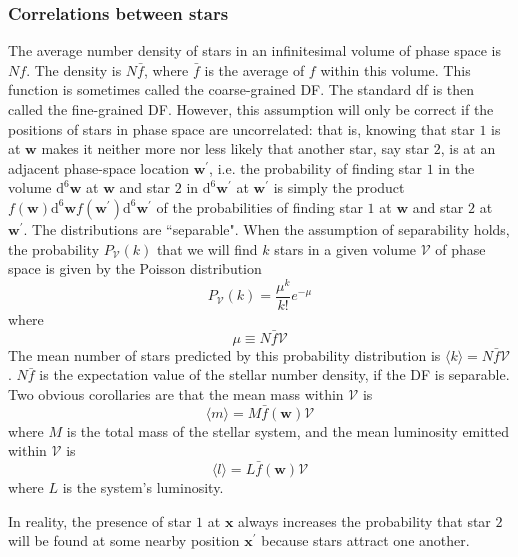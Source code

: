 \documentclass[12pt,a4paper]{article}
\renewcommand{\vec}[1]{\boldsymbol{#1}}
\newcommand{\dif}{\mathrm{d}}
\begin{document}
\subsubsection{Correlations between stars}
The average number density of stars in an infinitesimal volume of phase space is $Nf$. The density is $N \bar{f}$, where $\bar{f}$ is the average of $f$ within this volume. This function is sometimes called the coarse-grained DF. The standard df is then called the fine-grained DF. However, this assumption will only be correct if the positions of stars in phase space are uncorrelated: that is, knowing that star $1$ is at $\vec{w}$ makes it neither more nor less likely that another star, say star $2$, is at an adjacent phase-space location $\vec{w}^\prime$, i.e. the probability of finding star $1$ in the volume $\dif^6 \vec{w}$ at $\vec{w}$ and star $2$ in $\dif^6 \vec{w}^\prime$ at $\vec{w}^\prime$ is simply the product $f(\vec{w}) \dif^6 \vec{w} f(\vec{w}^\prime) \dif^6 \vec{w}^\prime$ of the probabilities of finding star $1$ at $\vec{w}$ and star $2$ at $\vec{w}^\prime$. The distributions are ``separable". When the assumption of separability holds, the probability $P_{\mathcal V}(k)$ that we will find $k$ stars in a given volume $\mathcal V$ of phase space is given by the Poisson distribution 
\begin{equation}
P_{\mathcal V}(k) = \frac{\mu^k}{k!} e^{-\mu} 
\end{equation}
where
\begin{equation}
\mu \equiv N \bar{f} \mathcal V
\end{equation}
The mean number of stars predicted by this probability distribution is $\langle k \rangle = N \bar{f} \mathcal V$. $N\bar{f}$ is the expectation value of the stellar number density, if the DF is separable. Two obvious corollaries are that the mean mass within $\mathcal V$ is
\begin{equation}
\langle m \rangle = M \bar{f}(\vec{w}) \mathcal V
\end{equation}
where $M$ is the total mass of the stellar system, and the mean luminosity emitted within $\mathcal V$ is
\begin{equation}
\langle l \rangle = L \bar{f}(\vec{w}) \mathcal V
\end{equation}
where $L$ is the system's luminosity.

In reality, the presence of star $1$ at $\vec{x}$ always increases the probability that star $2$ will be found at some nearby position $\vec{x}^\prime$ because stars attract one another.
\end{document}
